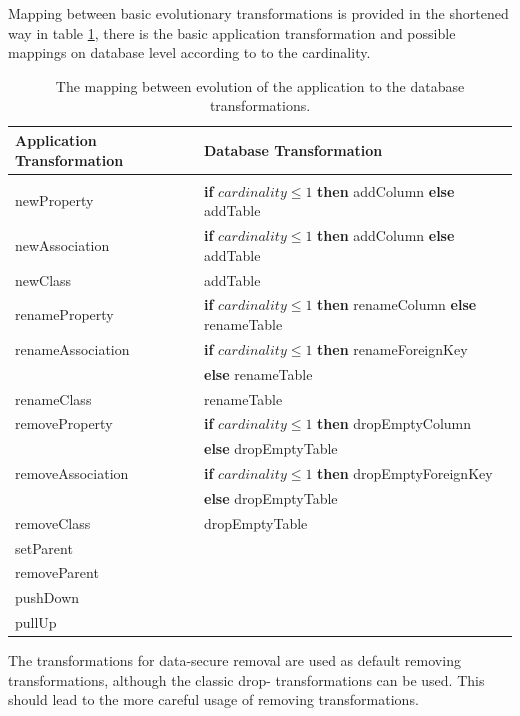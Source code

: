 \documentclass[runningheads]{comsis}
\begin{document}
Mapping between basic evolutionary transformations is provided in the shortened way in table \ref{tab:sw-basic-evolution}, there is the basic application transformation and possible mappings on database level according to to the cardinality.  
\begin{table}
	\caption{The mapping between evolution of the application to the database transformations.}
	\label{tab:sw-basic-evolution}
\centering
	\begin{tabular}{ll}
		\hline
	Application Transformation & Database Transformation \\
	\hline
	\\[-2ex] 
	newProperty & \textbf{if} $cardinality \leq 1$ \textbf{then} addColumn \textbf{else} addTable \\ 

	newAssociation & \textbf{if} $cardinality \leq 1$ \textbf{then} addColumn  \textbf{else} addTable \\

	newClass & addTable \\
	renameProperty & \textbf{if} $cardinality \leq 1$ \textbf{then}  renameColumn  \textbf{else} renameTable \\

	renameAssociation & \textbf{if} $cardinality \leq 1$ \textbf{then} renameForeignKey \\ & \hspace{1in} \textbf{else} renameTable \\
	
	renameClass & renameTable \\
	removeProperty & \textbf{if} $cardinality \leq 1$ \textbf{then} dropEmptyColumn  \\ & \hspace{1in}\textbf{else} dropEmptyTable \\
	
	removeAssociation & \textbf{if} $cardinality \leq 1$ \textbf{then}  dropEmptyForeignKey \\ & \hspace{1in} \textbf{else} dropEmptyTable \\

	removeClass & dropEmptyTable\\
	setParent & \\
	removeParent & \\
	pushDown &\\
	pullUp &\\
	\hline
	\end{tabular}
\end{table}
The transformations for data-secure removal are used as default removing transformations, although the classic drop- transformations can be used. This should lead to the more careful usage of removing transformations.
\end{document}
